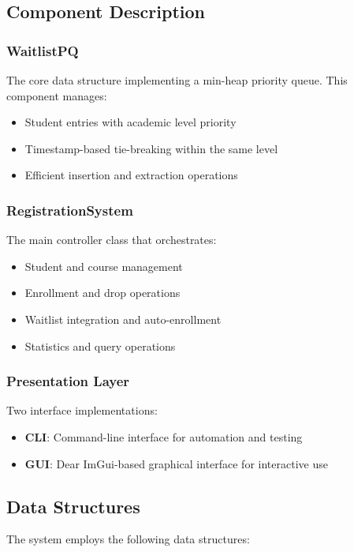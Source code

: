 \documentclass[12pt,a4paper]{article}
\begin{document}
\subsection{Component Description}

\subsubsection{WaitlistPQ}
The core data structure implementing a min-heap priority queue. This component manages:
\begin{itemize}
    \item Student entries with academic level priority
    \item Timestamp-based tie-breaking within the same level
    \item Efficient insertion and extraction operations
\end{itemize}

\subsubsection{RegistrationSystem}
The main controller class that orchestrates:
\begin{itemize}
    \item Student and course management
    \item Enrollment and drop operations
    \item Waitlist integration and auto-enrollment
    \item Statistics and query operations
\end{itemize}

\subsubsection{Presentation Layer}
Two interface implementations:
\begin{itemize}
    \item \textbf{CLI}: Command-line interface for automation and testing
    \item \textbf{GUI}: Dear ImGui-based graphical interface for interactive use
\end{itemize}

\subsection{Data Structures}
The system employs the following data structures:
\end{document}
